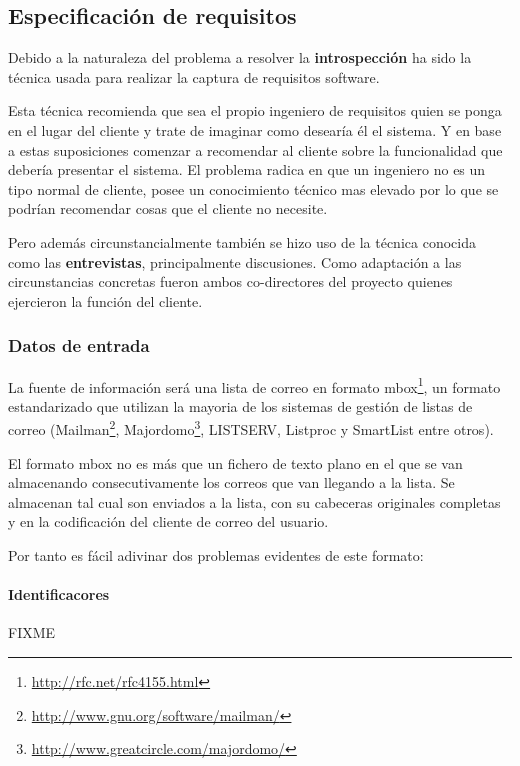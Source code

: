
\subsection{Especificación de requisitos}

Debido a la naturaleza del problema a resolver la \textbf{introspección}
ha sido la técnica usada para realizar la captura de requisitos software.

Esta técnica recomienda que sea el propio ingeniero de requisitos quien 
se ponga en el lugar del cliente y trate de imaginar como desearía él el 
sistema. Y en base a estas suposiciones comenzar a recomendar al cliente 
sobre la funcionalidad que debería presentar el sistema. El problema radica 
en  que un ingeniero no es un tipo normal de cliente, posee un conocimiento 
técnico mas elevado por lo que se podrían recomendar cosas que el cliente 
no necesite.

Pero además circunstancialmente también se hizo uso de la técnica conocida
como las \textbf{entrevistas}, principalmente discusiones. Como adaptación
a las circunstancias concretas fueron ambos co-directores del proyecto 
quienes ejercieron la función del cliente.

\subsubsection{Datos de entrada}

La fuente de información será una lista de correo en formato
mbox\footnote{\url{http://rfc.net/rfc4155.html}}, un formato estandarizado
que utilizan la mayoria de los sistemas de gestión de listas de correo
(Mailman\footnote{\url{http://www.gnu.org/software/mailman/}}, 
Majordomo\footnote{\url{http://www.greatcircle.com/majordomo/}},
LISTSERV, Listproc y SmartList entre otros).

El formato mbox no es más que un fichero de texto plano en el que se van
almacenando consecutivamente los correos que van llegando a la lista. Se 
almacenan tal cual son enviados a la lista, con su cabeceras originales 
completas y en la codificación del cliente de correo del usuario.

Por tanto es fácil adivinar dos problemas evidentes de este formato:

\paragraph{Identificacores}

FIXME

